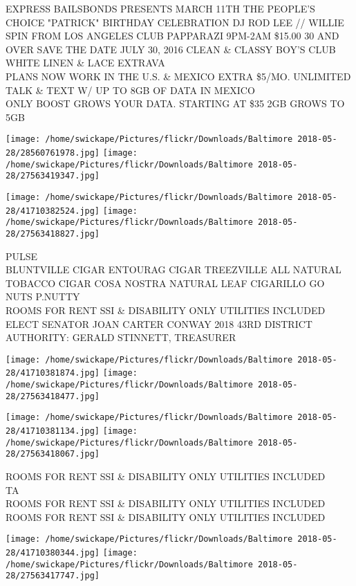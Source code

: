 \documentclass[10pt,letterpaper]{article}
\begin{document}
EXPRESS BAILSBONDS PRESENTS MARCH 11TH THE PEOPLE'S CHOICE "PATRICK" BIRTHDAY CELEBRATION DJ ROD LEE // WILLIE SPIN FROM LOS ANGELES CLUB PAPPARAZI 9PM{-}2AM \$15.00 30 AND OVER SAVE THE DATE JULY 30, 2016 CLEAN \& CLASSY BOY'S CLUB WHITE LINEN \& LACE EXTRAVA\\
PLANS NOW WORK IN THE U.S. \& MEXICO EXTRA \$5/MO. UNLIMITED TALK \& TEXT W/ UP TO 8GB OF DATA IN MEXICO\\
ONLY BOOST GROWS YOUR DATA.  STARTING AT \$35 2GB GROWS TO 5GB
\pagebreak

\texttt{[image: /home/swickape/Pictures/flickr/Downloads/Baltimore 2018-05-28/28560761978.jpg]}
\texttt{[image: /home/swickape/Pictures/flickr/Downloads/Baltimore 2018-05-28/27563419347.jpg]}

\texttt{[image: /home/swickape/Pictures/flickr/Downloads/Baltimore 2018-05-28/41710382524.jpg]}
\texttt{[image: /home/swickape/Pictures/flickr/Downloads/Baltimore 2018-05-28/27563418827.jpg]}

PULSE\\
BLUNTVILLE CIGAR ENTOURAG CIGAR TREEZVILLE ALL NATURAL TOBACCO CIGAR COSA NOSTRA NATURAL LEAF CIGARILLO GO NUTS P.NUTTY\\
ROOMS FOR RENT SSI \& DISABILITY ONLY UTILITIES INCLUDED\\
ELECT SENATOR JOAN CARTER CONWAY 2018 43RD DISTRICT AUTHORITY: GERALD STINNETT, TREASURER
\pagebreak

\texttt{[image: /home/swickape/Pictures/flickr/Downloads/Baltimore 2018-05-28/41710381874.jpg]}
\texttt{[image: /home/swickape/Pictures/flickr/Downloads/Baltimore 2018-05-28/27563418477.jpg]}

\texttt{[image: /home/swickape/Pictures/flickr/Downloads/Baltimore 2018-05-28/41710381134.jpg]}
\texttt{[image: /home/swickape/Pictures/flickr/Downloads/Baltimore 2018-05-28/27563418067.jpg]}

ROOMS FOR RENT SSI \& DISABILITY ONLY UTILITIES INCLUDED\\
TA\\
ROOMS FOR RENT SSI \& DISABILITY ONLY UTILITIES INCLUDED\\
ROOMS FOR RENT SSI \& DISABILITY ONLY UTILITIES INCLUDED
\pagebreak

\texttt{[image: /home/swickape/Pictures/flickr/Downloads/Baltimore 2018-05-28/41710380344.jpg]}
\texttt{[image: /home/swickape/Pictures/flickr/Downloads/Baltimore 2018-05-28/27563417747.jpg]}
\end{document}
